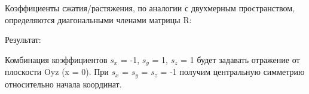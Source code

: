 Коэффициенты сжатия/растяжения, по аналогии с двухмерным пространством, определяются диагональными членами матрицы R:
\begin{figure}[H]
\end{figure}

\vspace*{5mm}Результат:

\begin{figure}[H]
\end{figure}

Комбинация коэффициентов $s_x$ = -1, $s_y$ = 1, $s_z$ = 1 будет задавать отражение от плоскости Oyz (x = 0). При $s_x$ = $s_y$ = $s_z$ = -1 получим центральную симметрию относительно начала координат.